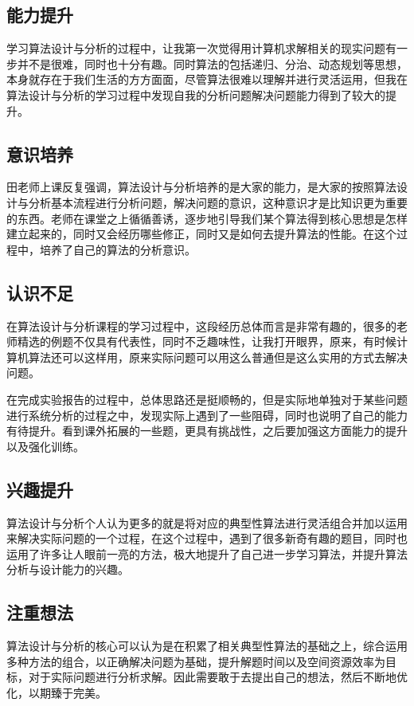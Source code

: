 \documentclass[UTF8]{ctexart}
\begin{document}
   	\subsection{能力提升}
   	学习算法设计与分析的过程中，让我第一次觉得用计算机求解相关的现实问题有一步并不是很难，同时也十分有趣。同时算法的包括递归、分治、动态规划等思想，本身就存在于我们生活的方方面面，尽管算法很难以理解并进行灵活运用，但我在算法设计与分析的学习过程中发现自我的分析问题解决问题能力得到了较大的提升。

   	\subsection{意识培养}
   	田老师上课反复强调，算法设计与分析培养的是大家的能力，是大家的按照算法设计与分析基本流程进行分析问题，解决问题的意识，这种意识才是比知识更为重要的东西。老师在课堂之上循循善诱，逐步地引导我们某个算法得到核心思想是怎样建立起来的，同时又会经历哪些修正，同时又是如何去提升算法的性能。在这个过程中，培养了自己的算法的分析意识。

   	\subsection{认识不足}
   	在算法设计与分析课程的学习过程中，这段经历总体而言是非常有趣的，很多的老师精选的例题不仅具有代表性，同时不乏趣味性，让我打开眼界，原来，有时候计算机算法还可以这样用，原来实际问题可以用这么普通但是这么实用的方式去解决问题。

   	在完成实验报告的过程中，总体思路还是挺顺畅的，但是实际地单独对于某些问题进行系统分析的过程之中，发现实际上遇到了一些阻碍，同时也说明了自己的能力有待提升。看到课外拓展的一些题，更具有挑战性，之后要加强这方面能力的提升以及强化训练。

   	\subsection{兴趣提升}
   	算法设计与分析个人认为更多的就是将对应的典型性算法进行灵活组合并加以运用来解决实际问题的一个过程，在这个过程中，遇到了很多新奇有趣的题目，同时也运用了许多让人眼前一亮的方法，极大地提升了自己进一步学习算法，并提升算法分析与设计能力的兴趣。

   	\subsection{注重想法}
    算法设计与分析的核心可以认为是在积累了相关典型性算法的基础之上，综合运用多种方法的组合，以正确解决问题为基础，提升解题时间以及空间资源效率为目标，对于实际问题进行分析求解。因此需要敢于去提出自己的想法，然后不断地优化，以期臻于完美。
\end{document}

